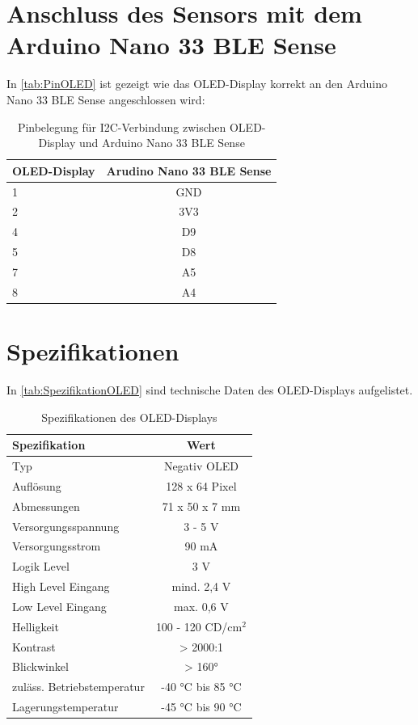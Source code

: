 \section{Anschluss des Sensors mit dem Arduino Nano 33 BLE Sense}

In \autoref{tab:PinOLED} ist gezeigt wie das OLED-Display korrekt an den Arduino Nano 33 BLE Sense angeschlossen wird:

\begin{table}[htpb]
	\centering
	\begin{tabular}{|l|c|}
		\hline
		\textbf{OLED-Display} & \textbf{Arudino Nano 33 BLE Sense} \\
		\hline
		1 & GND \\
		2 & 3V3 \\
		4 & D9 \\
		5 & D8 \\
		7 & A5 \\
		8 & A4 \\
		\hline
	\end{tabular}
	\caption{Pinbelegung für I2C-Verbindung zwischen OLED-Display und Arduino Nano 33 BLE Sense}
	\label{tab:PinOLED}
\end{table}

\section{Spezifikationen}

In \autoref{tab:SpezifikationOLED} sind technische Daten des OLED-Displays aufgelistet.

\begin{table}[htpb]
	\centering
	\begin{tabular}{|l|c|}
		\hline
		\textbf{Spezifikation} & \textbf{Wert} \\
		\hline
		Typ & Negativ OLED \\
		Auflösung & 128 x 64 Pixel \\
		Abmessungen & 71 x 50 x 7 mm \\
		Versorgungsspannung & 3 - 5 V \\
		Versorgungsstrom & 90 mA \\
		Logik Level & 3 V \\
		High Level Eingang & mind. 2,4 V \\
		Low Level Eingang & max. 0,6 V \\
		Helligkeit & 100 - 120 CD/$\mathrm{cm^2}$ \\
		Kontrast & > 2000:1 \\
		Blickwinkel & > 160° \\
		zuläss. Betriebstemperatur & -40 °C bis 85 °C \\
		Lagerungstemperatur & -45 °C bis 90 °C \\
		\hline
	\end{tabular}
	\caption{Spezifikationen des OLED-Displays}
	\label{tab:SpezifikationOLED}
\end{table}

